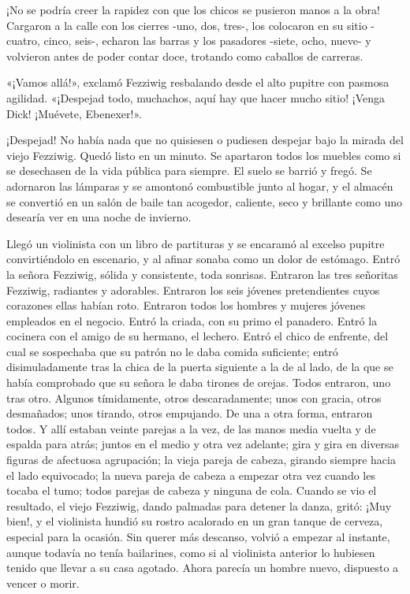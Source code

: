 \documentclass{novela}
\begin{document}
 ¡No se podría creer la rapidez con que los chicos se pusieron manos a la obra! Cargaron a la calle con los cierres -uno, dos, tres-, los colocaron en su sitio -cuatro, cinco, seis-, echaron las barras y los pasadores -siete, ocho, nueve- y volvieron antes de poder contar doce, trotando como caballos de carreras.

 «¡Vamos allá!», exclamó Fezziwig resbalando desde el alto pupitre con pasmosa agilidad. «¡Despejad todo, muchachos, aquí hay que hacer mucho sitio! ¡Venga Dick! ¡Muévete, Ebenexer!».

 ¡Despejad! No había nada que no quisiesen o pudiesen despejar bajo la mirada del viejo Fezziwig. Quedó listo en un minuto. Se apartaron todos los muebles como si se desechasen de la vida pública para siempre. El suelo se barrió y fregó. Se adornaron las lámparas y se amontonó combustible junto al hogar, y el almacén se convertió en un salón de baile tan acogedor, caliente, seco y brillante como uno desearía ver en una noche de invierno.

 Llegó un violinista con un libro de partituras y se encaramó al excelso pupitre convirtiéndolo en escenario, y al afinar sonaba como un dolor de estómago. Entró la señora Fezziwig, sólida y consistente, toda sonrisas. Entraron las tres señoritas Fezziwig, radiantes y adorables. Entraron los seis jóvenes pretendientes cuyos corazones ellas habían roto. Entraron todos los hombres y mujeres jóvenes empleados en el negocio. Entró la criada, con su primo el panadero. Entró la cocinera con el amigo de su hermano, el lechero. Entró el chico de enfrente, del cual se sospechaba que su patrón no le daba comida suficiente; entró disimuladamente tras la chica de la puerta siguiente a la de al lado, de la que se había comprobado que su señora le daba tirones de orejas. Todos entraron, uno tras otro. Algunos tímidamente, otros descaradamente; unos con gracia, otros desmañados; unos tirando, otros empujando. De una a otra forma, entraron todos. Y allí estaban veinte parejas a la vez, de las manos media vuelta y de espalda para atrás; juntos en el medio y otra vez adelante; gira y gira en diversas figuras de afectuosa agrupación; la vieja pareja de cabeza, girando siempre hacia el lado equivocado; la nueva pareja de cabeza a empezar otra vez cuando les tocaba el tumo; todos parejas de cabeza y ninguna de cola. Cuando se vio el resultado, el viejo Fezziwig, dando palmadas para detener la danza, gritó: ¡Muy bien!, y el violinista hundió su rostro acalorado en un gran tanque de cerveza, especial para la ocasión. Sin querer más descanso, volvió a empezar al instante, aunque todavía no tenía bailarines, como si al violinista anterior lo hubiesen tenido que llevar a su casa agotado. Ahora parecía un hombre nuevo, dispuesto a vencer o morir.
\end{document}
